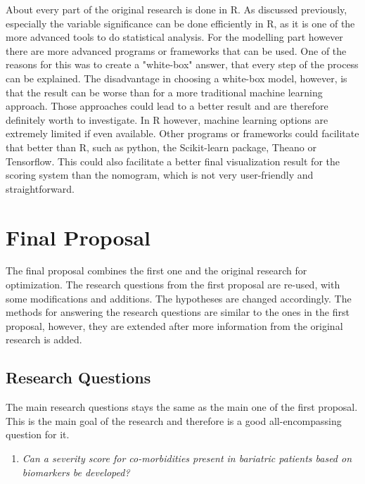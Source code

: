 \documentclass[10pt,a4paper]{article}
\begin{document}
	About every part of the original research is done in R. As discussed previously, especially the variable significance can be done efficiently in R, as it is one of the more advanced tools to do statistical analysis. For the modelling part however there are more advanced programs or frameworks that can be used. One of the reasons for this was to create a "white-box" answer, that every step of the process can be explained. The disadvantage in choosing a white-box model, however, is that the result can be worse than for a more traditional machine learning approach. Those approaches could lead to a better result and are therefore definitely worth to investigate. In R however, machine learning options are extremely limited if even available. Other programs or frameworks could facilitate that better than R, such as python, the Scikit-learn package, Theano or Tensorflow. This could also facilitate a better final visualization result for the scoring system than the nomogram, which is not very user-friendly and straightforward.
	
	\clearpage
	
	\section{Final Proposal}
	
	The final proposal combines the first one and the original research for optimization. The research questions from the first proposal are re-used, with some modifications and additions. The hypotheses are changed accordingly. The methods for answering the research questions are similar to the ones in the first proposal, however, they are extended after more information from the original research is added. 
	
	\subsection{Research Questions}
	
	The main research questions stays the same as the main one of the first proposal. This is the main goal of the research and therefore is a good all-encompassing question for it. 
	
	\begin{enumerate}
		\item[] \emph{Can a severity score for co-morbidities present in bariatric patients based on biomarkers be developed?}
	\end{enumerate}
	
\end{document}
